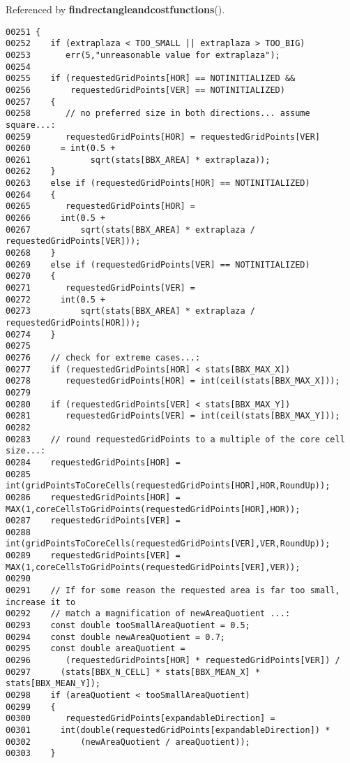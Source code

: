 Referenced by {\bf findrectangleandcostfunctions}().\small\begin{verbatim}00251 {
00252    if (extraplaza < TOO_SMALL || extraplaza > TOO_BIG)
00253       err(5,"unreasonable value for extraplaza");
00254 
00255    if (requestedGridPoints[HOR] == NOTINITIALIZED &&
00256        requestedGridPoints[VER] == NOTINITIALIZED)
00257    {
00258       // no preferred size in both directions... assume square...:
00259       requestedGridPoints[HOR] = requestedGridPoints[VER]
00260      = int(0.5 +
00261            sqrt(stats[BBX_AREA] * extraplaza));
00262    }
00263    else if (requestedGridPoints[HOR] == NOTINITIALIZED)
00264    {
00265       requestedGridPoints[HOR] =
00266      int(0.5 +
00267          sqrt(stats[BBX_AREA] * extraplaza / requestedGridPoints[VER]));
00268    }
00269    else if (requestedGridPoints[VER] == NOTINITIALIZED)
00270    {
00271       requestedGridPoints[VER] =
00272      int(0.5 + 
00273          sqrt(stats[BBX_AREA] * extraplaza / requestedGridPoints[HOR]));
00274    }
00275 
00276    // check for extreme cases...:
00277    if (requestedGridPoints[HOR] < stats[BBX_MAX_X])
00278       requestedGridPoints[HOR] = int(ceil(stats[BBX_MAX_X]));
00279 
00280    if (requestedGridPoints[VER] < stats[BBX_MAX_Y])
00281       requestedGridPoints[VER] = int(ceil(stats[BBX_MAX_Y]));
00282       
00283    // round requestedGridPoints to a multiple of the core cell size...:
00284    requestedGridPoints[HOR] =
00285       int(gridPointsToCoreCells(requestedGridPoints[HOR],HOR,RoundUp));
00286    requestedGridPoints[HOR] = MAX(1,coreCellsToGridPoints(requestedGridPoints[HOR],HOR));
00287    requestedGridPoints[VER] =
00288       int(gridPointsToCoreCells(requestedGridPoints[VER],VER,RoundUp));
00289    requestedGridPoints[VER] = MAX(1,coreCellsToGridPoints(requestedGridPoints[VER],VER));
00290 
00291    // If for some reason the requested area is far too small, increase it to
00292    // match a magnification of newAreaQuotient ...:
00293    const double tooSmallAreaQuotient = 0.5;
00294    const double newAreaQuotient = 0.7;
00295    const double areaQuotient =
00296       (requestedGridPoints[HOR] * requestedGridPoints[VER]) /
00297      (stats[BBX_N_CELL] * stats[BBX_MEAN_X] * stats[BBX_MEAN_Y]);
00298    if (areaQuotient < tooSmallAreaQuotient)
00299    {
00300       requestedGridPoints[expandableDirection] =
00301      int(double(requestedGridPoints[expandableDirection]) *
00302          (newAreaQuotient / areaQuotient));
00303    }
\end{verbatim}\normalsize 


